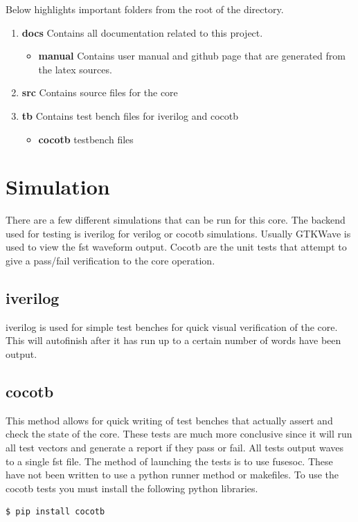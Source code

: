 \par
Below highlights important folders from the root of the directory.

\begin{enumerate}
  \item \textbf{docs} Contains all documentation related to this project.
    \begin{itemize}
      \item \textbf{manual} Contains user manual and github page that are generated from the latex sources.
    \end{itemize}
  \item \textbf{src} Contains source files for the core
  \item \textbf{tb} Contains test bench files for iverilog and cocotb
    \begin{itemize}
      \item \textbf{cocotb} testbench files
    \end{itemize}
\end{enumerate}

\newpage

\section{Simulation}
\par
There are a few different simulations that can be run for this core. The backend used for testing is iverilog for verilog or cocotb simulations. Usually GTKWave is used to view the fst waveform output. Cocotb are the unit tests that attempt to give a pass/fail verification to the core operation.

\subsection{iverilog}
\par
iverilog is used for simple test benches for quick visual verification of the core. This will autofinish after it has
run up to a certain number of words have been output.

\subsection{cocotb}
\par
This method allows for quick writing of test benches that actually assert and check the state of the core.
These tests are much more conclusive since it will run all test vectors and generate a report if they
pass or fail. All tests output waves to a single fst file. The method of launching the tests is to use
fusesoc. These have not been written to use a python runner method or makefiles.
To use the cocotb tests you must install the following python libraries.
\begin{lstlisting}[language=bash]
  $ pip install cocotb
\end{lstlisting}

